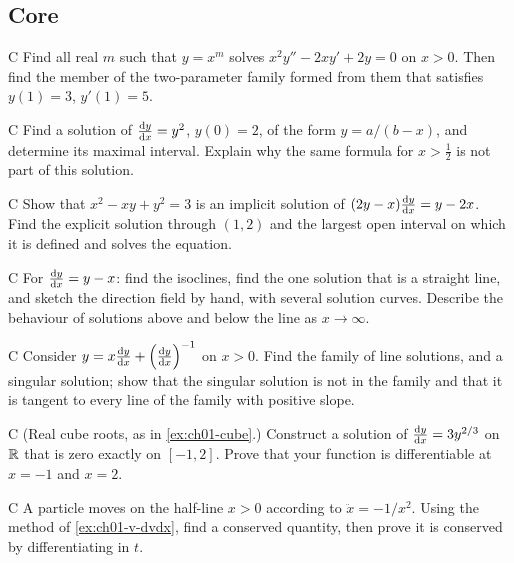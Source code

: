 \subsection*{Core}

\begin{problem}{C}\label{prob:ch01-c1}
Find all real $m$ such that $y = x^m$ solves $x^2y'' - 2xy' + 2y = 0$ on
$x>0$. Then find the member of the two-parameter family formed from them that
satisfies $y(1) = 3$, $y'(1) = 5$.
\end{problem}

\begin{problem}{C}\label{prob:ch01-c2}
Find a solution of $\frac{\mathrm{d}y}{\mathrm{d}x} = y^2$, $y(0) = 2$, of the form $y = a/(b - x)$,
and determine its maximal interval. Explain why the same formula for
$x > \tfrac12$ is not part of this solution.
\end{problem}

\begin{problem}{C}\label{prob:ch01-c3}
Show that $x^2 - xy + y^2 = 3$ is an implicit solution of
$(2y - x)\frac{\mathrm{d}y}{\mathrm{d}x} = y - 2x$. Find the explicit solution through $(1,2)$ and
the largest open interval on which it is defined and solves the equation.
\end{problem}

\begin{problem}{C}\label{prob:ch01-c4}
For $\frac{\mathrm{d}y}{\mathrm{d}x} = y - x$: find the isoclines, find the one solution that is a
straight line, and sketch the direction field by hand, with several solution
curves. Describe the behaviour of solutions above and below the line as
$x\to\infty$.
\end{problem}

\begin{problem}{C}\label{prob:ch01-c5}
Consider $y = x\frac{\mathrm{d}y}{\mathrm{d}x} + \Bigl(\frac{\mathrm{d}y}{\mathrm{d}x}\Bigr)^{-1}$ on $x>0$. Find the
family of line solutions, and a singular solution; show that the singular
solution is not in the family and that it is tangent to every line of the
family with positive slope.
\end{problem}

\begin{problem}{C}\label{prob:ch01-c6}
(Real cube roots, as in \cref{ex:ch01-cube}.) Construct a solution of
$\frac{\mathrm{d}y}{\mathrm{d}x} = 3y^{2/3}$ on $\mathbb{R}$ that is zero exactly on $[-1,2]$. Prove that
your function is differentiable at $x=-1$ and $x = 2$.
\end{problem}

\begin{problem}{C}\label{prob:ch01-c7}
A particle moves on the half-line $x>0$ according to $\ddot{x} = -1/x^2$.
Using the method of \cref{ex:ch01-v-dvdx}, find a conserved quantity, then prove
it is conserved by differentiating in $t$.
\end{problem}

